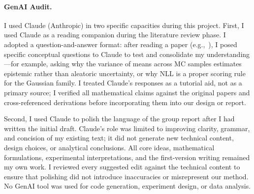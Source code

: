 \documentclass{llncs}
\begin{document}
\paragraph{GenAI Audit.}
I used Claude (Anthropic) in two specific capacities during this project. First, I used Claude as a reading companion during the literature review phase. I adopted a question-and-answer format: after reading a paper (e.g.,~\cite{kendall2017uncertainties,gal2016dropout}), I posed specific conceptual questions to Claude to test and consolidate my understanding---for example, asking why the variance of means across MC samples estimates epistemic rather than aleatoric uncertainty, or why NLL is a proper scoring rule for the Gaussian family. I treated Claude's responses as a tutorial aid, not as a primary source; I verified all mathematical claims against the original papers and cross-referenced derivations before incorporating them into our design or report.

Second, I used Claude to polish the language of the group report after I had written the initial draft. Claude's role was limited to improving clarity, grammar, and concision of my existing text; it did not generate new technical content, design choices, or analytical conclusions. All core ideas, mathematical formulations, experimental interpretations, and the first-version writing remained my own work. I reviewed every suggested edit against the technical content to ensure that polishing did not introduce inaccuracies or misrepresent our method. No GenAI tool was used for code generation, experiment design, or data analysis.



\end{document}

